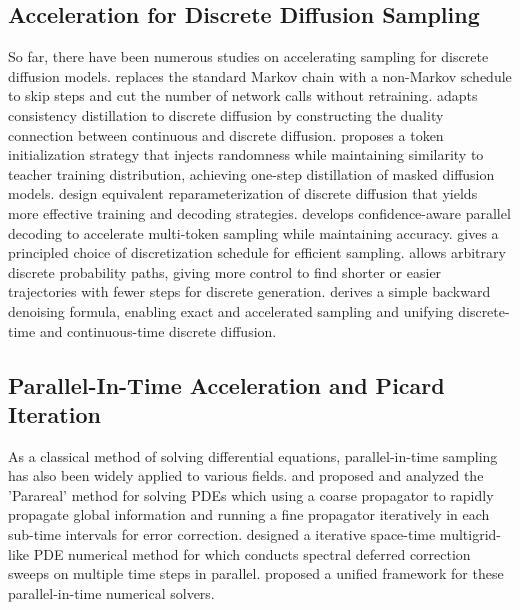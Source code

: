\documentclass{article}
\begin{document}
\subsection{Acceleration for Discrete Diffusion Sampling}
So far, there have been numerous studies on accelerating sampling for discrete diffusion models. \citep{chen2024fast} replaces the standard Markov chain with a non-Markov schedule to skip steps and cut the number of network calls without retraining. \citep{sahoo2025diffusion} adapts consistency distillation to discrete diffusion by constructing the duality connection between continuous and discrete diffusion. \citep{zhu2025di} proposes a token initialization strategy that injects randomness while maintaining similarity to teacher training distribution, achieving one-step distillation of masked diffusion models. \citep{zheng2023reparameterized, ou2024your} design equivalent reparameterization of discrete diffusion that yields more effective training and decoding strategies. \citep{wu2025fast} develops confidence-aware parallel decoding to accelerate multi-token sampling while maintaining accuracy.  \citep{zhang2025cosine} gives a principled choice of discretization schedule for efficient sampling. \citep{shaul2024flow} allows arbitrary discrete probability paths, giving more control to find shorter or easier trajectories with fewer steps for discrete generation. \citep{zhao2024unified} derives a simple backward denoising formula, enabling exact and accelerated sampling and unifying discrete-time and continuous-time discrete diffusion.



\subsection{Parallel-In-Time Acceleration and Picard Iteration}
As a classical method of solving differential equations, parallel-in-time sampling has also been widely applied to various fields. \citep{LionsEtAl2001} and \citep{gander2007analysis} proposed and analyzed the 'Parareal' method for solving PDEs which using a coarse propagator to rapidly propagate global information and running a fine propagator iteratively in each sub-time intervals for error correction. \citep{emmett2012toward} designed a iterative space-time multigrid-like PDE numerical method for which conducts spectral deferred correction sweeps on multiple time steps in parallel. \citep{gander2023unified} proposed a unified framework for these parallel-in-time numerical solvers.
\end{document}
